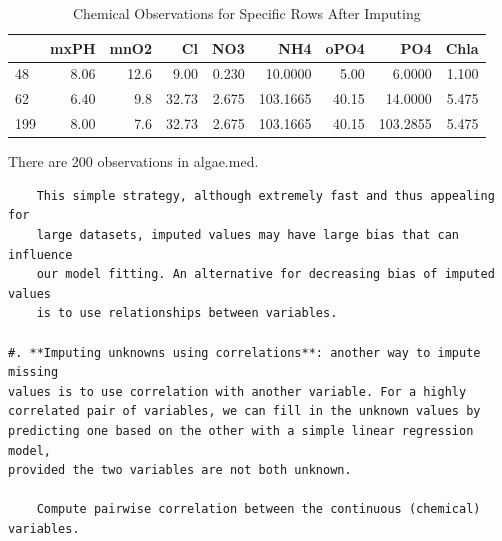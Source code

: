 \documentclass[]{article}
\newenvironment{Shaded}{\begin{snugshade}}{\end{snugshade}}
\newcommand{\KeywordTok}[1]{\textcolor[rgb]{0.13,0.29,0.53}{\textbf{#1}}}
\newcommand{\DataTypeTok}[1]{\textcolor[rgb]{0.13,0.29,0.53}{#1}}
\newcommand{\StringTok}[1]{\textcolor[rgb]{0.31,0.60,0.02}{#1}}
\newcommand{\OperatorTok}[1]{\textcolor[rgb]{0.81,0.36,0.00}{\textbf{#1}}}
\newcommand{\NormalTok}[1]{#1}
\begin{document}
\begin{table}

\caption{\label{tab:unnamed-chunk-5}Chemical Observations for Specific Rows After Imputing}
\centering
\begin{tabular}[t]{lrrrrrrrr}
\toprule
  & mxPH & mnO2 & Cl & NO3 & NH4 & oPO4 & PO4 & Chla\\
\midrule
48 & 8.06 & 12.6 & 9.00 & 0.230 & 10.0000 & 5.00 & 6.0000 & 1.100\\
62 & 6.40 & 9.8 & 32.73 & 2.675 & 103.1665 & 40.15 & 14.0000 & 5.475\\
199 & 8.00 & 7.6 & 32.73 & 2.675 & 103.1665 & 40.15 & 103.2855 & 5.475\\
\bottomrule
\end{tabular}
\end{table}

There are 200 observations in algae.med.

\begin{verbatim}
    This simple strategy, although extremely fast and thus appealing for
    large datasets, imputed values may have large bias that can influence
    our model fitting. An alternative for decreasing bias of imputed values
    is to use relationships between variables.
    
#. **Imputing unknowns using correlations**: another way to impute missing
values is to use correlation with another variable. For a highly
correlated pair of variables, we can fill in the unknown values by
predicting one based on the other with a simple linear regression model,
provided the two variables are not both unknown. 

    Compute pairwise correlation between the continuous (chemical) variables. 
\end{verbatim}

\begin{Shaded}
\end{Shaded}
\end{document}
